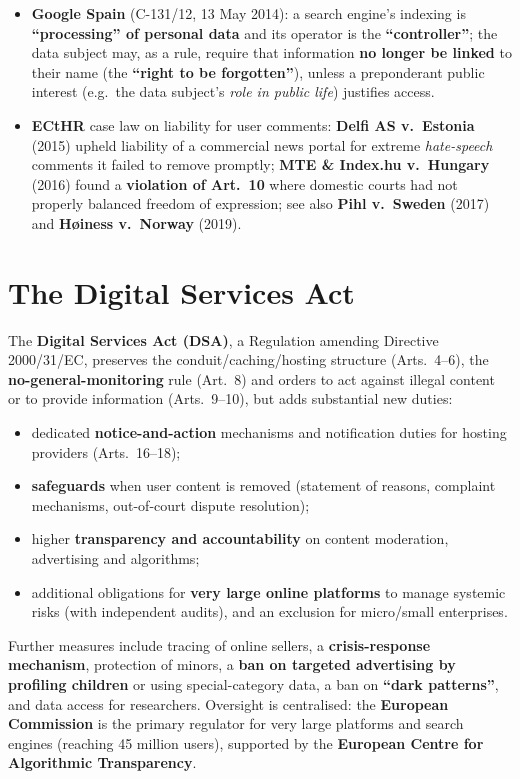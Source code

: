 \documentclass[11pt,a4paper,openany]{report}
\theoremstyle{definition}
\theoremstyle{plain}
\theoremstyle{remark}
\begin{document}
\begin{itemize}
    \item \textbf{Google Spain} (C-131/12, 13 May 2014): a search engine's indexing is \textbf{``processing'' of personal data} and its operator is the \textbf{``controller''}; the data subject may, as a rule, require that information \textbf{no longer be linked} to their name (the \textbf{``right to be forgotten''}), unless a preponderant public interest (e.g.\ the data subject's \emph{role in public life}) justifies access.
    \item \textbf{ECtHR} case law on liability for user comments: \textbf{Delfi AS v.\ Estonia} (2015) upheld liability of a commercial news portal for extreme \emph{hate-speech} comments it failed to remove promptly; \textbf{MTE \& Index.hu v.\ Hungary} (2016) found a \textbf{violation of Art.\ 10} where domestic courts had not properly balanced freedom of expression; see also \textbf{Pihl v.\ Sweden} (2017) and \textbf{H\o iness v.\ Norway} (2019).
\end{itemize}

\section{The Digital Services Act}

The \textbf{Digital Services Act (DSA)}, a Regulation amending Directive 2000/31/EC, preserves the conduit/caching/hosting structure (Arts.\ 4--6), the \textbf{no-general-monitoring} rule (Art.\ 8) and orders to act against illegal content or to provide information (Arts.\ 9--10), but adds substantial new duties:
\begin{itemize}
    \item dedicated \textbf{notice-and-action} mechanisms and notification duties for hosting providers (Arts.\ 16--18);
    \item \textbf{safeguards} when user content is removed (statement of reasons, complaint mechanisms, out-of-court dispute resolution);
    \item higher \textbf{transparency and accountability} on content moderation, advertising and algorithms;
    \item additional obligations for \textbf{very large online platforms} to manage systemic risks (with independent audits), and an exclusion for micro/small enterprises.
\end{itemize}
Further measures include tracing of online sellers, a \textbf{crisis-response mechanism}, protection of minors, a \textbf{ban on targeted advertising by profiling children} or using special-category data, a ban on \textbf{``dark patterns''}, and data access for researchers. Oversight is centralised: the \textbf{European Commission} is the primary regulator for very large platforms and search engines (reaching 45 million users), supported by the \textbf{European Centre for Algorithmic Transparency}.
\end{document}
